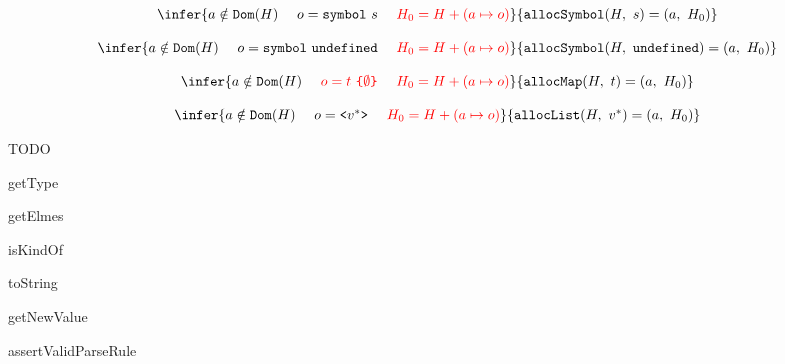 \[\begin{array}{c}
\infer
{a \notin \Term{Dom}(\symheap)\ \ \ \
o = \Term{symbol}\ s\ \ \ \
\inred{\symheap_0 = \symheap + (a \mapsto o)}}
{\hallocsym{\symheap}{s}{a}{\symheap_0}}
\\ \\
\infer
{a \notin \Term{Dom}(\symheap)\ \ \ \
o = \Term{symbol}\ \Term{undefined}\ \ \ \
\inred{\symheap_0 = \symheap + (a \mapsto o)}}
{\hallocsym{\symheap}{\Term{undefined}}{a}{\symheap_0}}
\\ \\
\infer
{a \notin \Term{Dom}(\symheap)\ \ \ \
\inred{o = t\ \Term{\{} {\emptyset} \Term{\}}}\ \ \ \
\inred{\symheap_0 = \symheap + (a \mapsto o)}}
{\hallocmap{\symheap}{t}{a}{\symheap_0}}
\\ \\
\infer
{a \notin \Term{Dom}(\symheap)\ \ \ \
o = \symlist{v^*}\ \ \ \
\inred{\symheap_0 = \symheap + (a \mapsto o)}}
{\halloclist{\symheap}{v^*}{a}{\symheap_0}}
\end{array}\]

TODO

getType

getElmes

isKindOf

toString

getNewValue

assertValidParseRule
